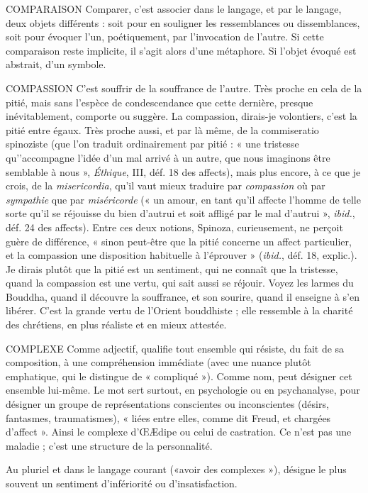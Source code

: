COMPARAISON Comparer, c’est associer dans le langage, et par le langage,
deux objets différents : soit pour en souligner les ressemblances
ou dissemblances, soit pour évoquer l’un, poétiquement, par l’invocation
de l’autre. Si cette comparaison reste implicite, il s’agit alors d’une métaphore.
Si l’objet évoqué est abstrait, d’un symbole.

COMPASSION C'est souffrir de la souffrance de l’autre. Très proche en
cela de la pitié, mais sans l’espèce de condescendance que
cette dernière, presque inévitablement, comporte ou suggère. La compassion,
dirais-je volontiers, c’est la pitié entre égaux. Très proche aussi, et par là même,
de la commiseratio spinoziste (que l’on traduit ordinairement par pitié : « une
tristesse qu'’accompagne l’idée d’un mal arrivé à un autre, que nous imaginons
être semblable à nous », {\it Éthique}, III, déf. 18 des affects), mais plus encore, à ce
que je crois, de la {\it misericordia}, qu’il vaut mieux traduire par {\it compassion} où par
{\it sympathie} que par {\it miséricorde} (« un amour, en tant qu’il affecte l’homme de
telle sorte qu’il se réjouisse du bien d’autrui et soit affligé par le mal d’autrui »,
{\it ibid.}, déf. 24 des affects). Entre ces deux notions, Spinoza, curieusement, ne
perçoit guère de différence, « sinon peut-être que la pitié concerne un affect
particulier, et la compassion une disposition habituelle à l’éprouver » ({\it ibid.},
déf. 18, explic.). Je dirais plutôt que la pitié est un sentiment, qui ne connaît
que la tristesse, quand la compassion est une vertu, qui sait aussi se réjouir.
Voyez les larmes du Bouddha, quand il découvre la souffrance, et son sourire,
quand il enseigne à s’en libérer. C’est la grande vertu de l'Orient bouddhiste ;
elle ressemble à la charité des chrétiens, en plus réaliste et en mieux attestée.

COMPLEXE Comme adjectif, qualifie tout ensemble qui résiste, du fait de
sa composition, à une compréhension immédiate (avec une
nuance plutôt emphatique, qui le distingue de « compliqué »). Comme nom,
peut désigner cet ensemble lui-même. Le mot sert surtout, en psychologie ou
en psychanalyse, pour désigner un groupe de représentations conscientes ou
inconscientes (désirs, fantasmes, traumatismes), « liées entre elles, comme dit
Freud, et chargées d’affect ». Ainsi le complexe d'ŒÆdipe ou celui de castration.
Ce n’est pas une maladie ; c’est une structure de la personnalité.

Au pluriel et dans le langage courant («avoir des complexes »), désigne le
plus souvent un sentiment d’infériorité ou d’insatisfaction.

